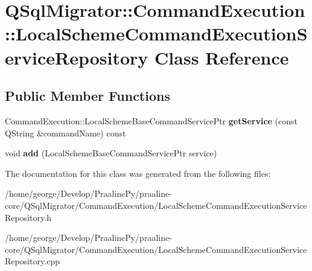 \hypertarget{class_q_sql_migrator_1_1_command_execution_1_1_local_scheme_command_execution_service_repository}{}\section{Q\+Sql\+Migrator\+:\+:Command\+Execution\+:\+:Local\+Scheme\+Command\+Execution\+Service\+Repository Class Reference}
\label{class_q_sql_migrator_1_1_command_execution_1_1_local_scheme_command_execution_service_repository}
\subsection*{Public Member Functions}
\begin{DoxyCompactItemize}
\item 
\mbox{\label{class_q_sql_migrator_1_1_command_execution_1_1_local_scheme_command_execution_service_repository_a5c5d241ff5f2e7718e5ae2b9ae989c50}} 
Command\+Execution\+::\+Local\+Scheme\+Base\+Command\+Service\+Ptr {\bfseries get\+Service} (const Q\+String \&command\+Name) const
\item 
\mbox{\label{class_q_sql_migrator_1_1_command_execution_1_1_local_scheme_command_execution_service_repository_a15f5681efa59225d2a33aa7d0a7f863d}} 
void {\bfseries add} (Local\+Scheme\+Base\+Command\+Service\+Ptr service)
\end{DoxyCompactItemize}


The documentation for this class was generated from the following files\+:\begin{DoxyCompactItemize}
\item 
/home/george/\+Develop/\+Praaline\+Py/praaline-\/core/\+Q\+Sql\+Migrator/\+Command\+Execution/Local\+Scheme\+Command\+Execution\+Service\+Repository.\+h\item 
/home/george/\+Develop/\+Praaline\+Py/praaline-\/core/\+Q\+Sql\+Migrator/\+Command\+Execution/Local\+Scheme\+Command\+Execution\+Service\+Repository.\+cpp\end{DoxyCompactItemize}

